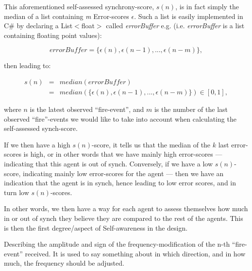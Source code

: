 			This aforementioned self-assessed synchrony-score, $s(n)$, is in fact simply the median of a list  containing \textit{m} Error-scores $\epsilon$. Such a list is easily implemented in C\# by declaring a List$<$float$>$ called \textit{errorBuffer} e.g. (i.e. \textit{errorBuffer} is a list containing floating point values):
			
			\begin{equation}
			\label{error_buffer}
				errorBuffer = \{\epsilon(n), \epsilon(n-1), ... , \epsilon(n-m)\},
			\end{equation} \nl
			
			then leading to:
			
			\begin{equation}
			\label{self_assessed_synch}
				\begin{array}{rrclcl}
				s(n) & = & median(errorBuffer) \\ 
				& = & median(\{\epsilon(n), \epsilon(n-1), ... , \epsilon(n-m)\}) \in [0, 1],
				\end{array}
			\end{equation} \nl
			
			where $n$ is the latest observed ``fire-event'', and $m$ is the number of the last observed ``fire''-events we would like to take into account when calculating the self-assessed synch-score.
			
			If we then have a high $s(n)$-score, it tells us that the median of the $k$ last error-scores is high, or in other words that we have mainly high error-scores — indicating that this agent is out of synch. Conversely, if we have a low $s(n)$-score, indicating mainly low error-scores for the agent — then we have an indication that the agent is in synch, hence leading to low error scores, and in turn low $s(n)$-scores. 
			
			In other words, we then have a way for each agent to assess themselves how much in or out of synch they believe they are compared to the rest of the agents. This is then the first degree/aspect of  Self-awareness in the design.
			
			
			Describing the amplitude and sign of the frequency-modification of the n-th ``fire-event'' received. It is used to say something about in which direction, and in how much, the frequency should be adjusted.
			
